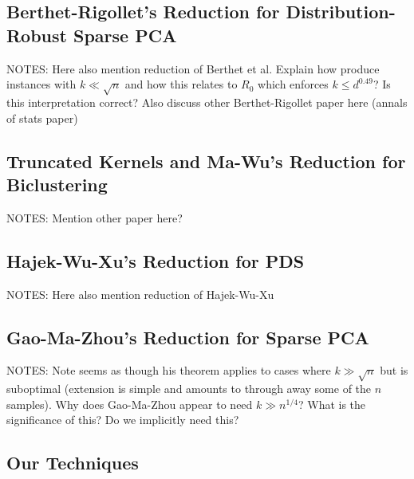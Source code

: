 \documentclass[11pt]{article}
\begin{document}
\subsection{Berthet-Rigollet's Reduction for Distribution-Robust Sparse PCA}

NOTES: Here also mention reduction of Berthet et al. Explain how produce instances with $k \ll \sqrt{n}$ and how this relates to $R_0$ which enforces $k \le d^{0.49}$? Is this interpretation correct? Also discuss other Berthet-Rigollet paper here (annals of stats paper)

\subsection{Truncated Kernels and Ma-Wu's Reduction for Biclustering}

NOTES: Mention other paper here?

\subsection{Hajek-Wu-Xu's Reduction for PDS}

NOTES: Here also mention reduction of Hajek-Wu-Xu

\subsection{Gao-Ma-Zhou's Reduction for Sparse PCA}

NOTES: Note seems as though his theorem applies to cases where $k \gg \sqrt{n}$ but is suboptimal (extension is simple and amounts to through away some of the $n$ samples). Why does Gao-Ma-Zhou appear to need $k \gg n^{1/4}$? What is the significance of this? Do we implicitly need this?

\subsection{Our Techniques}
\end{document}
